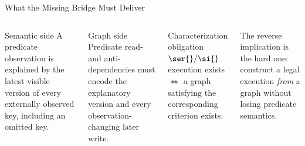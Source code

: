
\begin{frame}{What the Missing Bridge Must Deliver}
  \begin{columns}[T,onlytextwidth]
      \begin{block}{Semantic side}
        A predicate observation is explained by the latest visible version of
        every externally observed key, including an omitted key.
      \end{block}
      \begin{block}{Graph side}
        Predicate read- and anti-dependencies must encode the explanatory
        version and every observation-changing later write.
      \end{block}
      \begin{alertblock}{Characterization obligation}
        \centering
        $\ser{} / \si{}$ execution exists
        \quad$\Longleftrightarrow$\quad
        a graph satisfying the corresponding criterion exists.
      \end{alertblock}
      \vspace{.6em}
      \large The reverse implication is the hard one: construct a legal
      execution \emph{from} a graph without losing predicate semantics.
  \end{columns}
\end{frame}